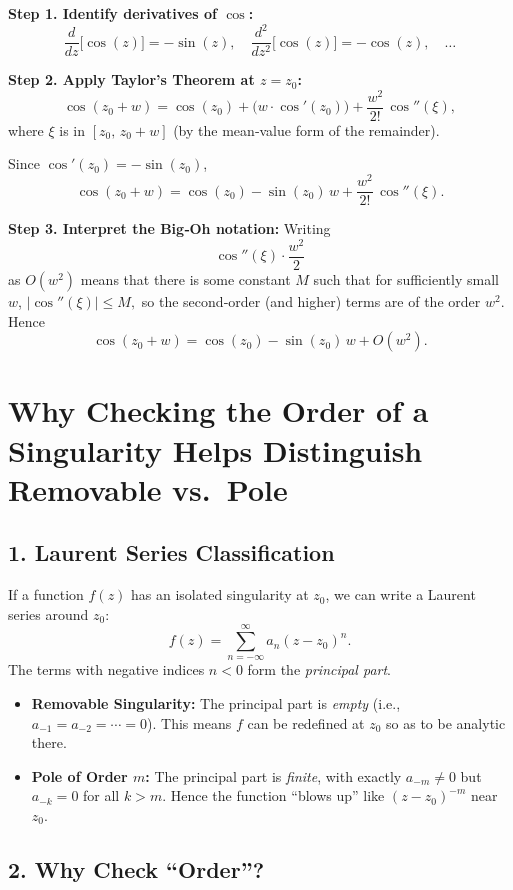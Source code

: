 \documentclass[12pt]{article}
\theoremstyle{definition} %
\theoremstyle{plain} %
\begin{document}
\medskip

\textbf{Step 1. Identify derivatives of \(\cos\):}
\[
\frac{d}{dz}\bigl[\cos(z)\bigr] = -\sin(z),
\quad
\frac{d^2}{dz^2}\bigl[\cos(z)\bigr] = -\cos(z),
\quad
\ldots
\]

\medskip

\textbf{Step 2. Apply Taylor’s Theorem at \(z=z_0\):}
\[
\cos(z_0 + w)
= \cos(z_0) 
+ \bigl(w\cdot \cos'(z_0)\bigr)
+ \frac{w^2}{2!}\,\cos''(\xi), 
\]
where \(\xi\) is in \([z_0,\,z_0+w]\) (by the mean‐value form of the remainder). 

Since \(\cos'(z_0)=-\sin(z_0)\),
\[
\cos(z_0 + w)
= \cos(z_0)
- \sin(z_0)\,w
+ \frac{w^2}{2!}\,\cos''(\xi).
\]

\medskip

\textbf{Step 3. Interpret the Big‐Oh notation:}
Writing 
\[
\cos''(\xi)\cdot \frac{w^2}{2} 
\]
as \(O(w^2)\) means that there is some constant \(M\) such that for sufficiently small \(w\),
\(\bigl|\cos''(\xi)\bigr|\le M,\)
so the second‐order (and higher) terms are of the order \(w^2\). Hence
\[
\cos(z_0 + w)
= \cos(z_0)
- \sin(z_0)\,w
+ O(w^2).
\]
\section*{Why Checking the Order of a Singularity Helps Distinguish Removable vs.\ Pole}

\subsection*{1. Laurent Series Classification}

If a function $f(z)$ has an isolated singularity at $z_0$, we can write a Laurent series around $z_0$:
\[
f(z) = \sum_{n=-\infty}^\infty a_n (z - z_0)^n.
\]
The terms with negative indices $n<0$ form the \emph{principal part}.

\begin{itemize}
  \item \textbf{Removable Singularity:} The principal part is \emph{empty} (i.e., $a_{-1} = a_{-2} = \cdots = 0$). This means $f$ can be redefined at $z_0$ so as to be analytic there.
  \item \textbf{Pole of Order $m$:} The principal part is \emph{finite}, with exactly $a_{-m}\neq 0$ but $a_{-k}=0$ for all $k>m$. Hence the function “blows up” like $(z-z_0)^{-m}$ near $z_0$.
\end{itemize}

\subsection*{2. Why Check “Order”?}
\end{document}
